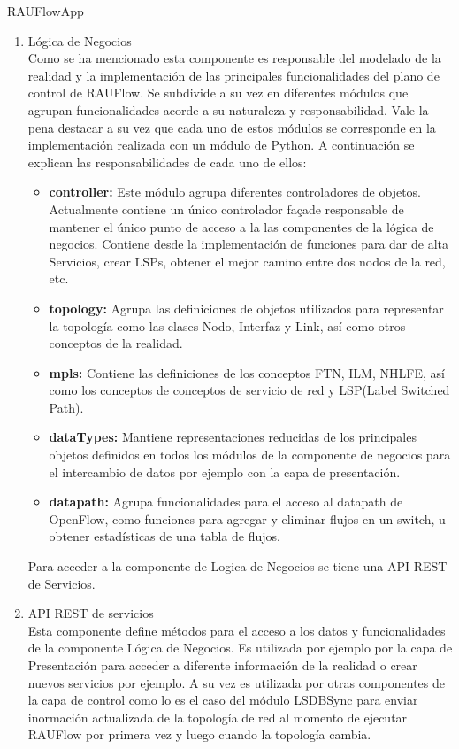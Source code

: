 \begin{subsubsection}{RAUFlowApp}
\begin{enumerate}
\item Lógica de Negocios\\
Como se ha mencionado esta componente es responsable del modelado de la realidad y la implementaci\'on de las principales funcionalidades del plano de control de RAUFlow. Se subdivide a su vez en diferentes m\'odulos que agrupan funcionalidades acorde a su naturaleza y responsabilidad. Vale la pena destacar a su vez que cada uno de estos m\'odulos se corresponde en la implementaci\'on realizada con un m\'odulo de Python. A continuaci\'on se explican las responsabilidades de cada uno de ellos:

\begin{itemize}
\item \textbf{controller:} Este m\'odulo agrupa diferentes controladores de objetos. Actualmente contiene un \'unico controlador façade responsable de mantener el \'unico punto de acceso a la las componentes de la l\'ogica de negocios. Contiene desde la implementaci\'on de funciones para dar de alta Servicios, crear LSPs, obtener el mejor camino entre dos nodos de la red, etc.

\item \textbf{topology:} Agrupa las definiciones de objetos utilizados para representar la topolog\'ia como las clases Nodo, Interfaz y Link, así como otros conceptos de la realidad.
 
\item \textbf{mpls:} Contiene las definiciones de los conceptos FTN, ILM, NHLFE, as\'i como los conceptos de conceptos de servicio de red y LSP(Label Switched Path).

\item \textbf{dataTypes:} Mantiene representaciones reducidas de los principales objetos definidos en todos los m\'odulos de la componente de negocios para el intercambio de datos por ejemplo con la capa de presentaci\'on. 

\item \textbf{datapath:} Agrupa funcionalidades para el acceso al datapath de OpenFlow, como funciones para agregar y eliminar flujos en un switch, u obtener estad\'isticas de una tabla de flujos.
\end{itemize} 

Para acceder a la componente de Logica de Negocios se tiene una API REST de Servicios.

\item API REST de servicios\\
Esta componente define m\'etodos para el acceso a los datos y funcionalidades de la componente Lógica de Negocios. Es utilizada por ejemplo por la capa de Presentaci\'on para acceder a diferente informaci\'on de la realidad o crear nuevos servicios por ejemplo. A su vez es utilizada por otras componentes de la capa de control como lo es el caso del m\'odulo LSDBSync para enviar inormaci\'on actualizada de la topolog\'ia de red al momento de ejecutar RAUFlow por primera vez y luego cuando la topolog\'ia cambia. 


\end{enumerate}
\end{subsubsection}
